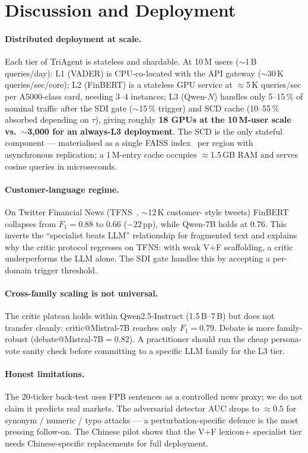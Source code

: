\section{Discussion and Deployment}
\label{sec:discussion}

\paragraph{Distributed deployment at scale.}
Each tier of TriAgent is stateless and shardable. At 10\,M users
($\sim$1\,B queries/day): L1 (VADER) is CPU-co-located with the API
gateway ($\sim$30\,K queries/sec/core); L2 (FinBERT) is a stateless
GPU service at $\approx$5\,K queries/sec per A5000-class card,
needing 3--4 instances; L3 (Qwen-$N$) handles only 5--15\,\% of
nominal traffic after the SDI gate ($\sim$15\,\% trigger) and SCD
cache (10--55\,\% absorbed depending on $\tau$), giving roughly
\textbf{18 GPUs at the 10\,M-user scale vs.\ $\sim$3{,}000 for an
always-L3 deployment}. The SCD is the only stateful component ---
materialised as a single FAISS index~\cite{johnson2019faiss} per
region with asynchronous replication; a 1\,M-entry cache occupies
$\approx$1.5\,GB RAM and serves cosine queries in microseconds.

\paragraph{Customer-language regime.}
On Twitter Financial News (TFNS~\cite{tfns}, $\sim$12\,K customer-
style tweets) FinBERT collapses from $F_1=0.88$ to $0.66$
($-22$\,pp), while Qwen-7B holds at $0.76$. This inverts the
``specialist beats LLM'' relationship for fragmented text and
explains why the critic protocol regresses on TFNS: with weak V$+$F
scaffolding, a critic underperforms the LLM alone. The SDI gate
handles this by accepting a per-domain trigger threshold.

\paragraph{Cross-family scaling is not universal.}
The critic plateau holds within Qwen2.5-Instruct (1.5\,B--7\,B) but
does not transfer cleanly: critic@Mistral-7B reaches only $F_1=0.79$.
Debate is more family-robust (debate@Mistral-7B$=0.82$). A
practitioner should run the cheap persona-vote sanity check before
committing to a specific LLM family for the L3 tier.

\paragraph{Honest limitations.}
The 20-ticker back-test uses FPB sentences as a controlled news
proxy; we do not claim it predicts real markets. The adversarial
detector AUC drops to $\approx\!0.5$ for synonym / numeric / typo
attacks --- a perturbation-specific defence is the most pressing
follow-on. The Chinese pilot shows that the V$+$F lexicon$+$
specialist tier needs Chinese-specific replacements for full
deployment.
